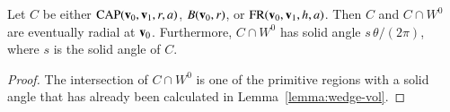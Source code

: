 \begin{lemma}\label{lemma:wedge-sol}  
Let $C$ be either ${\operatorname{CAP}}({\mathbf v}_0,{\mathbf v}_1,r,a)$, $B({\mathbf v}_0,r)$, or
${\operatorname{FR}}({\mathbf v}_0,{\mathbf v}_1,h,a)$.  Then $C$ and $C\cap W^0$ are eventually
radial at ${\mathbf v}_0$. Furthermore, $C\cap W^0$ has solid angle
$s\,\theta/(2\pi)$, where $s$ is the solid angle of $C$.
\end{lemma}

\begin{proof} The intersection of $C\cap W^0$ is one of the primitive
  regions with a solid angle that has already been calculated in
  Lemma~\ref{lemma:wedge-vol}.
\end{proof}



%
%
%
